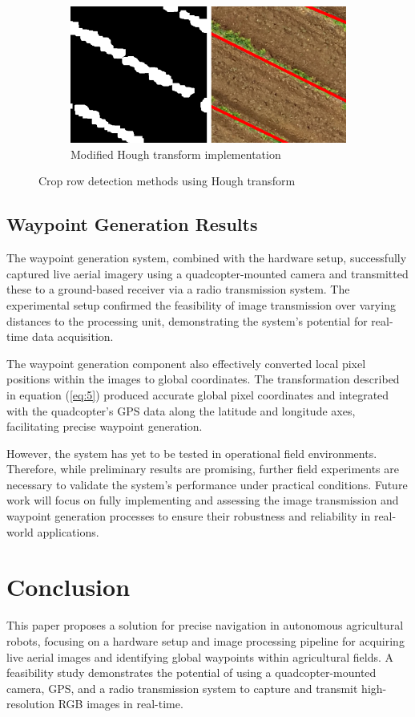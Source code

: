 \documentclass[conference]{IEEEtran}
\begin{document}
\begin{figure}[t]
		\begin{subfigure}{\linewidth}
			\centering
			\includegraphics[width=0.7\linewidth]{Hough Revised2.png}
			\caption{Modified Hough transform implementation}
			\label{fig_Hough_mod}
		\end{subfigure}
		
		\caption{Crop row detection methods using Hough transform \cite{b5}}
		\label{fig:comparison}
	\end{figure}
	
	\subsection{Waypoint Generation Results}
	
	The waypoint generation system, combined with the hardware setup, successfully captured live aerial imagery using a quadcopter-mounted camera and transmitted these to a ground-based receiver via a radio transmission system. The experimental setup confirmed the feasibility of image transmission over varying distances to the processing unit, demonstrating the system’s potential for real-time data acquisition.
	
	The waypoint generation component also effectively converted local pixel positions within the images to global coordinates. The transformation described in equation (\ref{eq:5}) produced accurate global pixel coordinates and integrated with the quadcopter’s GPS data along the latitude and longitude axes, facilitating precise waypoint generation.
	
	However, the system has yet to be tested in operational field environments. Therefore, while preliminary results are promising, further field experiments are necessary to validate the system’s performance under practical conditions. Future work will focus on fully implementing and assessing the image transmission and waypoint generation processes to ensure their robustness and reliability in real-world applications.
	
	
	\section{Conclusion}\label{Conclusion}
	This paper proposes a solution for precise navigation in autonomous agricultural robots, focusing on a hardware setup and image processing pipeline for acquiring live aerial images and identifying global waypoints within agricultural fields. A feasibility study demonstrates the potential of using a quadcopter-mounted camera, GPS, and a radio transmission system to capture and transmit high-resolution RGB images in real-time.
	
\end{document}
